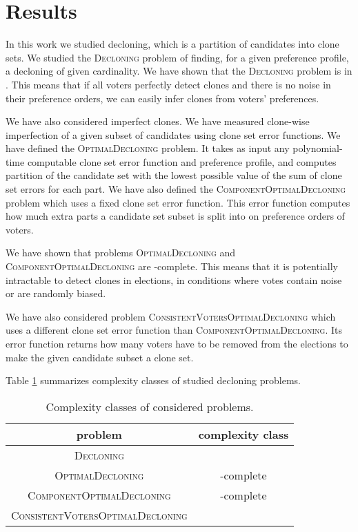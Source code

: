 \section{Results}

In this work we studied decloning, which is a partition of candidates into clone sets.
We studied the \textsc{Decloning} problem of finding,
for a given preference profile, a decloning of given cardinality.
We have shown that the \textsc{Decloning} problem is in \p.
This means that if all voters perfectly detect clones
and there is no noise in their preference orders,
we can easily infer clones from voters' preferences.

We have also considered imperfect clones.
We have measured clone-wise imperfection of a given subset of candidates using clone set error functions.
We have defined the \textsc{OptimalDecloning} problem.
It takes as input any polynomial-time computable clone set error function and preference profile,
and computes partition of the candidate set with the lowest possible value of the sum of clone set errors for each part.
We have also defined the \textsc{ComponentOptimalDecloning} problem which uses a fixed clone set error function.
This error function computes how much extra parts a candidate set subset is split into
on preference orders of voters.

We have shown that problems \textsc{OptimalDecloning} and \textsc{ComponentOptimalDecloning}
are \np-complete.
This means that it is potentially intractable to detect clones in elections,
in conditions where votes contain noise or are randomly biased.

We have also considered problem \textsc{ConsistentVotersOptimalDecloning}
which uses a different clone set error function than \textsc{ComponentOptimalDecloning}.
Its error function returns how many voters have to be removed from the elections
to make the given candidate subset a clone set.

Table \ref{cclasses} summarizes complexity classes of studied decloning problems.

\begin{table}
\centering
\begin{tabular}{| c | c |}\hline
	\textbf{problem} & \textbf{complexity class} \\ \hline
	\textsc{Decloning} & \p \\ \hline
	\textsc{OptimalDecloning} & \np-complete \\ \hline
	\textsc{ComponentOptimalDecloning} & \np-complete \\ \hline
	\textsc{ConsistentVotersOptimalDecloning} & \np \\ \hline
\end{tabular}
\caption{Complexity classes of considered problems.} \label{cclasses}
\end{table}



